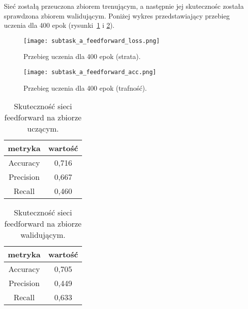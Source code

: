 Sieć zostałą przeuczona zbiorem trenującym, a następnie jej skutecznośc została sprawdzona zbiorem walidującym. Poniżej wykres przedstawiający przebieg uczenia dla 400 epok (rysunki~\ref{fig:ffloss} i \ref{fig:ffacc}).

\begin{figure}[H]
\caption{Przebieg uczenia dla 400 epok (strata). \label{fig:ffloss}}
\centering
\texttt{[image: subtask\_a\_feedforward\_loss.png]}
\end{figure}


\begin{figure}[H]
\caption{Przebieg uczenia dla 400 epok (trafność). \label{fig:ffacc}}
\centering
\texttt{[image: subtask\_a\_feedforward\_acc.png]}
\end{figure}




\begin{table}[H]
\caption{Skuteczność sieci feedforward na zbiorze uczącym.\label{tab:ffu}}
\label{train_set_statistics_score_table}
    \begin{center}
        \begin{tabular}{ |c|c| } 
            \hline
            metryka & wartość\\
            \hline
            Accuracy & 0,716 \\
            \hline
            Precision & 0,667 \\
            \hline
            Recall & 0,460 \\ 
            \hline
        \end{tabular}
    \end{center}
\end{table}

\begin{table}[H]
\caption{Skuteczność sieci feedforward na zbiorze walidującym.\label{tab:ffw}}
\label{train_set_statistics_score_table}
    \begin{center}
        \begin{tabular}{ |c|c| } 
            \hline
            metryka & wartość\\
            \hline
            Accuracy & 0,705 \\
            \hline
            Precision & 0,449 \\
            \hline
            Recall & 0,633 \\ 
            \hline
        \end{tabular}
    \end{center}
\end{table}


